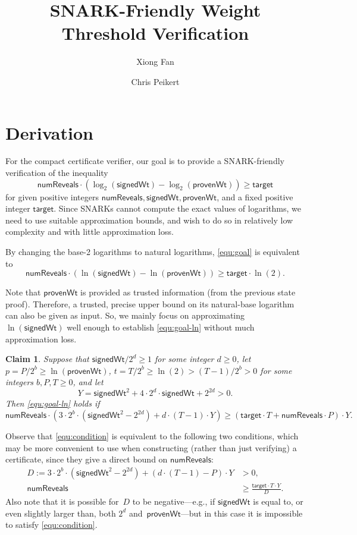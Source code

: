 \documentclass[11pt,hidelinks]{article}
\author{Xiong Fan}
\author{Chris Peikert}
\affil{Algorand, Inc.}
\newtheorem{claim}[theorem]{Claim}
\newcommand{\numreveals}{\mathsf{numReveals}}
\newcommand{\sigwt}{\mathsf{signedWt}}
\newcommand{\provwt}{\mathsf{provenWt}}
\newcommand{\target}{\mathsf{target}}
\begin{document}
\title{SNARK-Friendly Weight Threshold Verification}

\maketitle

\section{Derivation}
\label{sec:derivation}

For the compact certificate verifier, our goal is to provide a SNARK-friendly verification of the inequality
\begin{equation}
    \label{equ:goal}
    \numreveals\cdot (\log_2(\sigwt) - \log_2(\provwt)) \geq \target
\end{equation}
for given positive integers $\numreveals, \sigwt, \provwt$, and a fixed positive integer $\target$.
Since SNARKs cannot compute the exact values of logarithms, we need to use suitable approximation bounds, and wish to do so in relatively low complexity and with little approximation loss.

By changing the base-2 logarithms to natural logarithms, \cref{equ:goal} is equivalent to
\begin{equation}
\label{equ:goal-ln}
    \numreveals\cdot (\ln(\sigwt) - \ln(\provwt)) \geq \target \cdot \ln(2).
\end{equation}

Note that $\provwt$ is provided as trusted information (from the previous state proof).
Therefore, a trusted, precise upper bound on its natural-base logarithm can also be given as input.
So, we mainly focus on approximating $\ln(\sigwt)$ well enough to establish \cref{equ:goal-ln} without much approximation loss.

\begin{claim}
\label{clm:sufficient}
Suppose that $\sigwt/2^d \geq 1$ for some integer $d \geq 0$, let $p = P/2^b \geq \ln(\provwt)$, $t = T/2^b \geq \ln(2) > (T - 1)/2^b > 0$ for some integers $b, P, T \geq 0$, and let
\[ Y = \sigwt^2 + 4 \cdot 2^d \cdot \sigwt + 2^{2d} > 0. \] 
Then \cref{equ:goal-ln} holds if
\begin{equation}
    \label{equ:condition}
    \numreveals \cdot \left( 3\cdot 2^b \cdot (\sigwt^2 - 2^{2d}) + d \cdot (T - 1) \cdot Y\right) \geq (\target \cdot T + \numreveals \cdot P) \cdot Y .
\end{equation}
\end{claim}
Observe that \cref{equ:condition} is equivalent to the following two conditions, which may be more convenient to use when constructing (rather than just verifying) a certificate, since they give a direct bound on $\numreveals$:
\begin{align}
    D := 3\cdot 2^b \cdot (\sigwt^2 - 2^{2d}) + (d \cdot (T - 1) - P) \cdot Y &> 0 , \\
\numreveals &\geq \frac{\target \cdot T \cdot Y}{D} .
\end{align}
Also note that it is possible for~$D$ to be negative---e.g., if $\sigwt$ is equal to, or even slightly larger than, both $2^d$ and~$\provwt$---but in this case it is impossible to satisfy \cref{equ:condition}.
\end{document}
